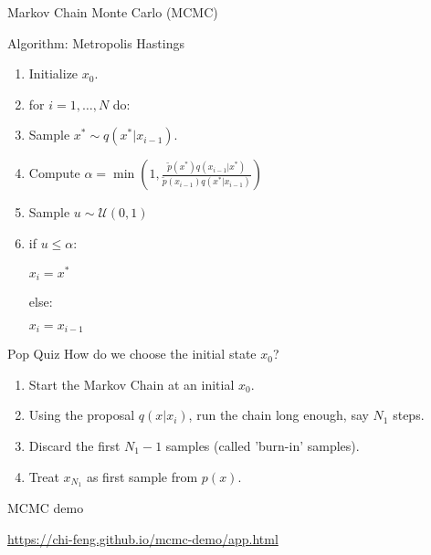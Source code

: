 \documentclass{beamer}
\begin{document}
\begin{section}{Markov Chain Monte Carlo (MCMC)}
    \begin{frame}{Algorithm: Metropolis Hastings}
        \begin{enumerate}
            \item Initialize $x_0$.
            \item for $i = 1, \ldots, N$ do:
            \item \quad Sample $x^* \sim q(x^*|x_{i-1})$.
            \item \quad Compute $\alpha = \min (1, \frac{\tilde{p}(x^*)q(x_{i-1}|x^*)}{\tilde{p}(x_{i-1})q(x^*|x_{i-1})})$
            \item \quad Sample $u \sim \mathcal{U}(0, 1)$
            \item \quad if $u \leq \alpha$:
            
            \quad \quad $x_i = x^*$
            
            \quad else:
            
            \quad \quad $x_i = x_{i-1}$
        \end{enumerate}
    \end{frame}

    \begin{frame}{Pop Quiz}
        How do we choose the initial state $x_0$?
        \pause
        \begin{enumerate}
            \item Start the Markov Chain at an initial $x_0$.
            \item Using the proposal $q(x|x_i)$, run the chain long enough, say $N_1$ steps.
            \item Discard the first $N_1 - 1$ samples (called 'burn-in' samples).
            \item Treat $x_{N_1}$ as first sample from $p(x)$.
        \end{enumerate}
    \end{frame}

    \begin{frame}{MCMC demo}
        
        \url{https://chi-feng.github.io/mcmc-demo/app.html}
    \end{frame}
\end{section}
\end{document}
